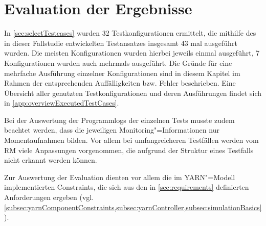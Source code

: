 \chapter{Evaluation der Ergebnisse}
\label{ch:evaluationResults}

In \cref{sec:selectTestcases} wurden 32 Testkonfigurationen ermittelt, die mithilfe des in dieser Fallstudie entwickelten Testansatzes insgesamt 43 mal ausgeführt wurden.
Die meisten Konfigurationen wurden hierbei jeweils einmal ausgeführt, 7 Konfigurationen wurden auch mehrmals ausgeführt.
Die Gründe für eine mehrfache Ausführung einzelner Konfigurationen sind in diesem Kapitel im Rahmen der entsprechenden Auffälligkeiten bzw. Fehler beschrieben.
Eine Übersicht aller genutzten Testkonfigurationen und deren Ausführungen findet sich in \cref{app:overviewExecutedTestCases}.

Bei der Auswertung der Programmlogs der einzelnen Tests musste zudem beachtet werden, dass die jeweiligen Monitoring"=Informationen nur Momentaufnahmen bilden.
Vor allem bei umfangreicheren Testfällen werden vom \gls{RM} viele Anpassungen vorgenommen, die aufgrund der Struktur eines Testfalls nicht erkannt werden können.

Zur Auswertung der Evaluation dienten vor allem die im YARN"=Modell implementierten Constraints, die sich aus den in \cref{sec:requirements} definierten Anforderungen ergeben (vgl. \cref{subsec:yarnComponentConstraints,subsec:yarnController,subsec:simulationBasics}).
















